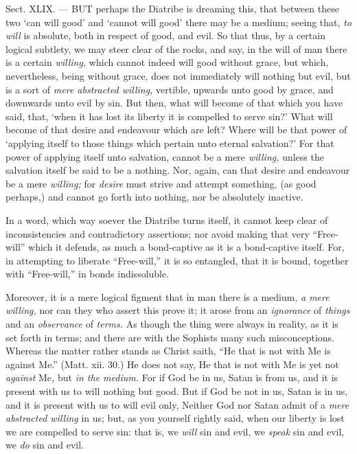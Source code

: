
Sect. XLIX. — BUT perhaps the Diatribe is dreaming this, that between these two ‘can will good’ and ‘cannot will good’ there may be a medium; seeing that, \emph{to will }is absolute, both in respect of good, and evil. So that thus, by a certain logical subtlety, we may steer clear of the rocks, and say, in the will of man there is a certain \emph{willing, }which cannot indeed will good without grace, but which, nevertheless, being without grace, does not immediately will nothing but evil, but is a sort of \emph{mere abstracted willing, }vertible, upwards unto good by grace, and downwards unto evil by sin. But then, what will become of that which you have said, that, ‘when it has lost its liberty it is compelled to serve sin?’ What will become of that desire and endeavour which are left? Where will be that power of ‘applying itself to those things which pertain unto eternal salvation?’ For that power of applying itself unto salvation, cannot be a mere \emph{willing, }unless the salvation itself be said to be a nothing. Nor, again, can that desire and endeavour be a mere \emph{willing; }for \emph{desire }must strive and attempt something, (as good perhaps,) and cannot go forth into nothing, nor be absolutely inactive.

In a word, which way soever the Diatribe turns itself, it cannot keep clear of inconsistencies and contradictory assertions; nor avoid making that very “Free-will” which it defends, as much a bond-captive as it is a bond-captive itself. For, in attempting to liberate “Free-will,” it is so entangled, that it is bound, together with “Free-will,” in bonds indissoluble.

Moreover, it is a mere logical figment that in man there is a medium, \emph{a mere willing, }nor can they who assert this prove it; it arose from an \emph{ignorance }of \emph{things }and an \emph{observance }of \emph{terms. }As though the thing were always in reality, as it is set forth in terms; and there are with the Sophists many such misconceptions. Whereas the matter rather stands as Christ saith, “He that is not with Me is against Me.” (Matt. xii. 30.) He does not say, He that is not with Me is yet not \emph{against }Me\emph{, }but \emph{in the medium. }For if God be in us, Satan is from us, and it is present with us to will nothing but good. But if God be not in us, Satan is in us, and it is present with us to will evil only, Neither God nor Satan admit of a \emph{mere abstracted willing }in us; but, as you yourself rightly said, when our liberty is lost we are compelled to serve sin: that is, we \emph{will }sin and evil, we \emph{ speak }sin and evil, we \emph{do }sin and evil.

